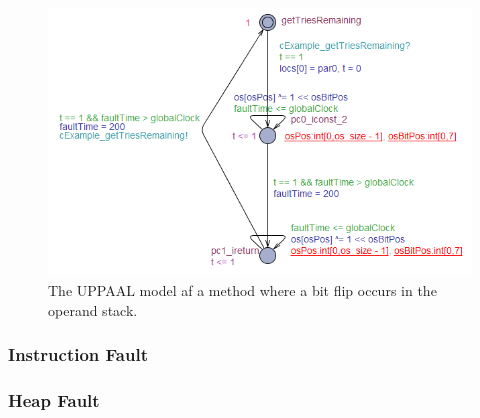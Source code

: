 \begin{figure}[H]
\centering
\includegraphics{figures/reportExamples/opstackRewrite.PNG}
\caption{The UPPAAL model af a method where a bit flip occurs in the operand stack.}
\label{fig:opstackFlip}
\end{figure}
\subsubsection{Instruction Fault}
\subsubsection{Heap Fault}